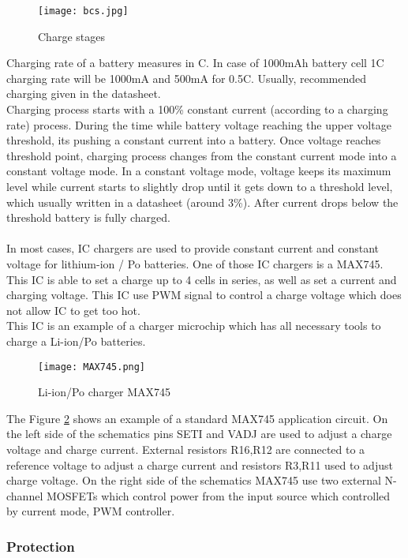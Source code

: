 \begin{figure}[h]
	\centering
	\texttt{[image: bcs.jpg]}
	\caption{ Charge stages \cite{14}}
	\label{fig: bcs}
\end{figure}
 Charging rate of a battery measures in C. In case of 1000mAh battery cell 1C charging rate will be 1000mA and 500mA for 0.5C. Usually, recommended charging given in the datasheet.\\
 Charging process starts with a 100\%  constant current (according to a charging rate) process. During the time while battery voltage reaching the upper voltage threshold, its pushing a constant current into a battery. Once voltage reaches threshold point, charging process changes from the constant current mode into a constant voltage mode. In a constant voltage mode, voltage keeps its maximum level while current starts to slightly drop until it gets down to a threshold level, which usually written in a datasheet (around 3\%). After current drops below the threshold battery is fully charged. \\ \\
 In most cases, IC chargers are used to provide constant current and constant voltage for lithium-ion / Po batteries. \cite{14} One of those IC chargers is a MAX745. 
This IC is able to set a charge up to 4 cells in series, as well as set a current and charging voltage. This IC use PWM signal to control a charge voltage which does not allow IC to get too hot.\\ This IC is an example of a charger microchip which has all necessary  tools to charge a Li-ion/Po batteries. 



\begin{figure}[h]
	\centering
	\texttt{[image: MAX745.png]}
	\caption{ Li-ion/Po charger MAX745 \cite{15}}
	\label{fig: EPS22}
\end{figure}

The Figure \ref{fig: EPS22} shows an example of a standard MAX745 application circuit. On the left side of the schematics pins SETI and VADJ are used to adjust a charge voltage and charge current. External resistors R16,R12 are connected to a reference voltage to adjust a charge current and resistors R3,R11  used to adjust charge voltage. On the right side of the schematics MAX745 use two external N-channel MOSFETs which control power from the input source which controlled by current mode, PWM controller. 



\subsubsection{Protection}

